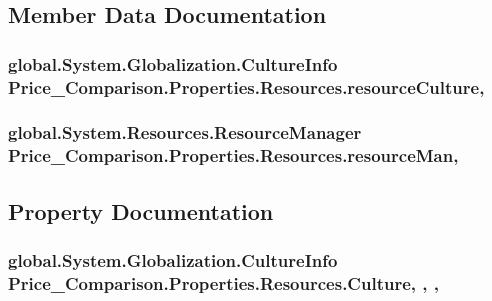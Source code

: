 \subsection{Member Data Documentation}
\hypertarget{class_price___comparison_1_1_properties_1_1_resources_a6b5d70a8d1cc43967ff954c497780abb}{
\subsubsection[{resource\-Culture}]{\setlength{\rightskip}{0pt plus 5cm}global.\-System.\-Globalization.\-Culture\-Info Price\-\_\-\-Comparison.\-Properties.\-Resources.\-resource\-Culture\hspace{0.3cm}{\ttfamily [static]}, {\ttfamily [private]}}}\label{class_price___comparison_1_1_properties_1_1_resources_a6b5d70a8d1cc43967ff954c497780abb}
\hypertarget{class_price___comparison_1_1_properties_1_1_resources_a5d32379f455f8a43f885294c638351ae}{
\subsubsection[{resource\-Man}]{\setlength{\rightskip}{0pt plus 5cm}global.\-System.\-Resources.\-Resource\-Manager Price\-\_\-\-Comparison.\-Properties.\-Resources.\-resource\-Man\hspace{0.3cm}{\ttfamily [static]}, {\ttfamily [private]}}}\label{class_price___comparison_1_1_properties_1_1_resources_a5d32379f455f8a43f885294c638351ae}


\subsection{Property Documentation}
\hypertarget{class_price___comparison_1_1_properties_1_1_resources_ab30ad00e418076b616a98d4615cb53c7}{
\subsubsection[{Culture}]{\setlength{\rightskip}{0pt plus 5cm}global.\-System.\-Globalization.\-Culture\-Info Price\-\_\-\-Comparison.\-Properties.\-Resources.\-Culture\hspace{0.3cm}{\ttfamily [static]}, {\ttfamily [get]}, {\ttfamily [set]}, {\ttfamily [package]}}}\label{class_price___comparison_1_1_properties_1_1_resources_ab30ad00e418076b616a98d4615cb53c7}


